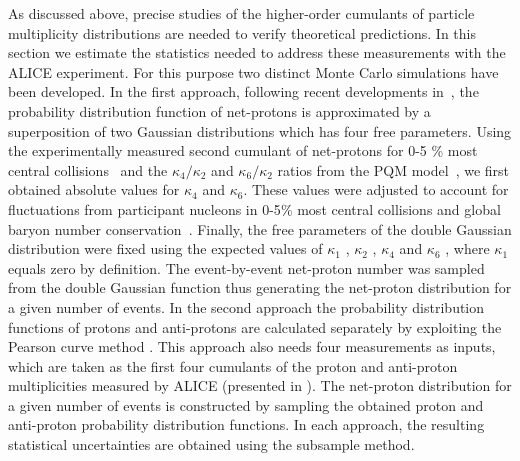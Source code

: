 As discussed above, precise studies of the higher-order cumulants of particle multiplicity distributions are needed to verify theoretical predictions. In this section we estimate the statistics needed to address these measurements with the ALICE experiment. For this purpose two distinct  Monte Carlo simulations have been developed. In the first approach, following recent developments in~\cite{Bzdak:2018axe}, the probability distribution function of net-protons is approximated  by a superposition of two Gaussian distributions which has four free parameters. Using the experimentally measured second cumulant of net-protons for 0-5 \% most central \PbPb collisions~\cite{Rustamov:2017lio} and the $\kappa_{4}/\kappa_{2}$ and $\kappa_{6}/\kappa_{2}$ ratios from the PQM model~\cite{Almasi:2017bhq}, we first obtained absolute values for $\kappa_{4}$ and $\kappa_{6}$.  These values were adjusted to account for fluctuations from participant nucleons in 0-5$\%$ most central \PbPb collisions and global baryon number conservation~\cite{Braun-Munzinger:2016yjz, Braun-Munzinger:2018yru}. Finally, the free parameters of the double Gaussian distribution were fixed using the expected values of $\kappa_{1}$ , $\kappa_{2}$ , $\kappa_{4}$ and $\kappa_{6}$ , where $\kappa_{1}$ equals zero by definition. The event-by-event net-proton number was sampled from the double Gaussian function  thus generating the net-proton distribution for a given number of events. 
In the second approach the probability distribution functions of protons and anti-protons are calculated separately by exploiting the Pearson curve method \cite{Behera:2017xwg}. This approach also needs four measurements as inputs, which are taken as the first four cumulants of the proton and anti-proton multiplicities measured by ALICE (presented in \cite{Behera:2018wqk}).  The net-proton distribution for a given number of events is constructed by sampling the obtained proton and anti-proton probability distribution functions. 
In each approach, the resulting statistical uncertainties are obtained using the subsample method.  

